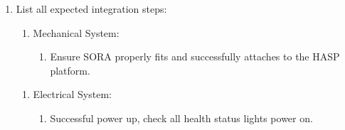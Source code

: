 \begin{minipage}{\linewidth-0.5cm}
\begin{enumerate}[label = \Alph*.]
  \item List all expected integration steps:
        \begin{enumerate}[label = -]
          \item Mechanical System:
          \begin{enumerate}
          \item Ensure SORA properly fits and successfully attaches to the HASP platform.
          \end{enumerate}
        \end{enumerate}
        \begin{enumerate}[label = -]
          \item Electrical System:
          \begin{enumerate}
          \item Successful power up, check all health status lights power on.
          \end{enumerate}
        \end{enumerate}
  \end{enumerate}
\end{minipage}

